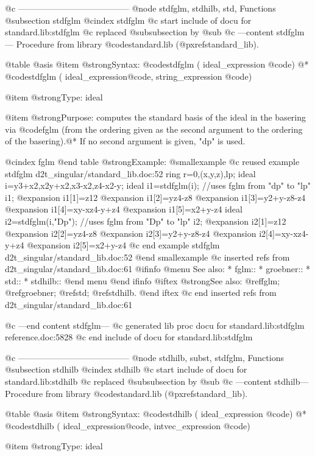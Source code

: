 {{{{{{{@c ---------------------------------------
@node stdfglm, stdhilb, std, Functions
@subsection stdfglm
@cindex stdfglm
@c start include of docu for standard.lib:stdfglm
@c replaced @subsubsection by @sub
@c ---content stdfglm---
Procedure from library @code{standard.lib} (@pxref{standard_lib}).

@table @asis
@item @strong{Syntax:}
@code{stdfglm (} ideal_expression @code{)} @*
@code{stdfglm (} ideal_expression@code{,} string_expression @code{)}

@item @strong{Type:}
ideal

@item @strong{Purpose:}
computes the standard basis of the ideal in the basering
via @code{fglm} (from the ordering given as the second argument
to the ordering of the basering).@*
If no second argument is given, "dp" is used.

@cindex fglm
@end table
@strong{Example:}
@smallexample
@c reused example stdfglm d2t_singular/standard_lib.doc:52 
   ring r=0,(x,y,z),lp;
ideal i=y3+x2,x2y+x2,x3-x2,z4-x2-y;
ideal i1=stdfglm(i);         //uses fglm from "dp" to "lp"
i1;
@expansion{} i1[1]=z12
@expansion{} i1[2]=yz4-z8
@expansion{} i1[3]=y2+y-z8-z4
@expansion{} i1[4]=xy-xz4-y+z4
@expansion{} i1[5]=x2+y-z4
ideal i2=stdfglm(i,"Dp");    //uses fglm from "Dp" to "lp"
i2;
@expansion{} i2[1]=z12
@expansion{} i2[2]=yz4-z8
@expansion{} i2[3]=y2+y-z8-z4
@expansion{} i2[4]=xy-xz4-y+z4
@expansion{} i2[5]=x2+y-z4
@c end example stdfglm d2t_singular/standard_lib.doc:52
@end smallexample
@c inserted refs from d2t_singular/standard_lib.doc:61
@ifinfo
@menu
See also:
* fglm::
* groebner::
* std::
* stdhilb::
@end menu
@end ifinfo
@iftex
@strong{See also:}
@ref{fglm};
@ref{groebner};
@ref{std};
@ref{stdhilb}.
@end iftex
@c end inserted refs from d2t_singular/standard_lib.doc:61

@c ---end content stdfglm---
@c generated lib proc docu for standard.lib:stdfglm reference.doc:5828 
@c end include of docu for standard.lib:stdfglm

@c ---------------------------------------
@node stdhilb, subst, stdfglm, Functions
@subsection stdhilb
@cindex stdhilb
@c start include of docu for standard.lib:stdhilb
@c replaced @subsubsection by @sub
@c ---content stdhilb---
Procedure from library @code{standard.lib} (@pxref{standard_lib}).

@table @asis
@item @strong{Syntax:}
@code{stdhilb (} ideal_expression @code{)} @*
@code{stdhilb (} ideal_expression@code{,} intvec_expression @code{)}

@item @strong{Type:}
ideal

}}}}}}}
